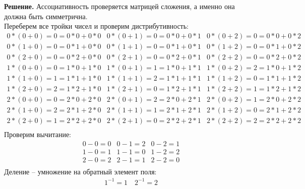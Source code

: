 \documentclass[a4paper, 12pt]{article}
\begin{document}
\begin{spacing}{1}
\begin{center}
\end{center}
\textbf{Решение.}
Ассоциативность проверяется матрицей сложения, а именно она должна быть симметрична.\\
\noindent Переберем все тройки чисел и проверим дистрибутивность:\\

$\begin{array}{l|l|l}
	 0 * (0 + 0) = 0 = 0 * 0 + 0 * 0   & 
	 0 * (0 + 1) = 0 = 0 * 0 + 0 * 1   & 
	 0 * (0 + 2) = 0 = 0 * 0 + 0 * 2   \\ 
	 0 * (1 + 0) = 0 = 0 * 1 + 0 * 0   & 
	 0 * (1 + 1) = 0 = 0 * 1 + 0 * 1   & 
	 0 * (1 + 2) = 0 = 0 * 1 + 0 * 2   \\ 
	 0 * (2 + 0) = 0 = 0 * 2 + 0 * 0   & 
	 0 * (2 + 1) = 0 = 0 * 2 + 0 * 1   & 
	 0 * (2 + 2) = 0 = 0 * 2 + 0 * 2   \\ 
	 1 * (0 + 0) = 0 = 1 * 0 + 1 * 0   & 
	 1 * (0 + 1) = 1 = 1 * 0 + 1 * 1   & 
	 1 * (0 + 2) = 2 = 1 * 0 + 1 * 2   \\ 
	 1 * (1 + 0) = 1 = 1 * 1 + 1 * 0   & 
	 1 * (1 + 1) = 2 = 1 * 1 + 1 * 1   & 
	 1 * (1 + 2) = 0 = 1 * 1 + 1 * 2   \\ 
	 1 * (2 + 0) = 2 = 1 * 2 + 1 * 0   & 
	 1 * (2 + 1) = 0 = 1 * 2 + 1 * 1   & 
	 1 * (2 + 2) = 1 = 1 * 2 + 1 * 2   \\ 
	 2 * (0 + 0) = 0 = 2 * 0 + 2 * 0   & 
	 2 * (0 + 1) = 2 = 2 * 0 + 2 * 1   & 
	 2 * (0 + 2) = 1 = 2 * 0 + 2 * 2   \\ 
	 2 * (1 + 0) = 2 = 2 * 1 + 2 * 0   & 
	 2 * (1 + 1) = 1 = 2 * 1 + 2 * 1   & 
	 2 * (1 + 2) = 0 = 2 * 1 + 2 * 2   \\ 
	 2 * (2 + 0) = 1 = 2 * 2 + 2 * 0   & 
	 2 * (2 + 1) = 0 = 2 * 2 + 2 * 1   & 
	 2 * (2 + 2) = 2 = 2 * 2 + 2 * 2   \\ 
\end{array} $\\[20pt]
Проверим вычитание: \\
$$
\begin{array}{ccc}
	 0 - 0 = 0   & 
	 0 - 1 = 2   & 
	 0 - 2 = 1   \\ 
	 1 - 0 = 1   & 
	 1 - 1 = 0   & 
	 1 - 2 = 2   \\ 
	 2 - 0 = 2   & 
	 2 - 1 = 1   & 
	 2 - 2 = 0   \\  
\end{array} $$
Деление -- умножение на обратный элемент поля:
\begin{align*}
1^{-1} = 1 \quad 2^{-1} = 2
\end{align*}




\end{spacing}
\end{document}
